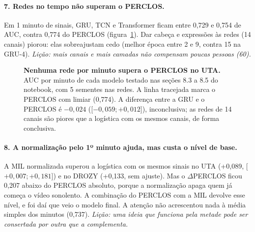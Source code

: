 \documentclass[11pt,a4paper]{article}
\newcommand{\ic}[2]{\textcolor{black!65}{[$#1$;\,$#2$]}}  %
\begin{document}
\paragraph{7. Redes no tempo não superam o PERCLOS.} Em 1 minuto de sinais, GRU, TCN e Transformer ficam entre 0,729 e 0,754 de AUC, contra 0,774 do PERCLOS (figura~\ref{fig:prog}). Dar cabeça e expressões às redes (14 canais) piorou: elas sobreajustam cedo (melhor época entre 2 e 9, contra 15 na GRU-4). \emph{Lição: mais canais e mais camadas não compensam poucas pessoas (60).}

\begin{figure}[!t]
\centering
{}
\caption{\textbf{Nenhuma rede por minuto supera o PERCLOS no UTA.} AUC por minuto de cada modelo testado nas seções 8.3 a 8.5 do notebook, com 5 sementes nas redes. A linha tracejada marca o PERCLOS com limiar (0,774). A diferença entre a GRU e o PERCLOS é $-0{,}024$ (\ic{-0{,}059}{+0{,}012}), inconclusiva; as redes de 14 canais são piores que a logística com os mesmos canais, de forma conclusiva.}
\label{fig:prog}
\end{figure}

\paragraph{8. A normalização pelo 1º minuto ajuda, mas custa o nível de base.} A MIL normalizada superou a logística com os mesmos sinais no UTA (+0,089, \ic{+0{,}007}{+0{,}181}) e no DROZY (+0,133, sem ajuste). Mas o $\Delta$PERCLOS ficou 0,207 abaixo do PERCLOS absoluto, porque a normalização apaga quem já começa o vídeo sonolento. A combinação do PERCLOS com a MIL devolve esse nível, e foi daí que veio o modelo final. A atenção não acrescentou nada à média simples dos minutos (0,737). \emph{Lição: uma ideia que funciona pela metade pode ser consertada por outra que a complementa.}
\end{document}
